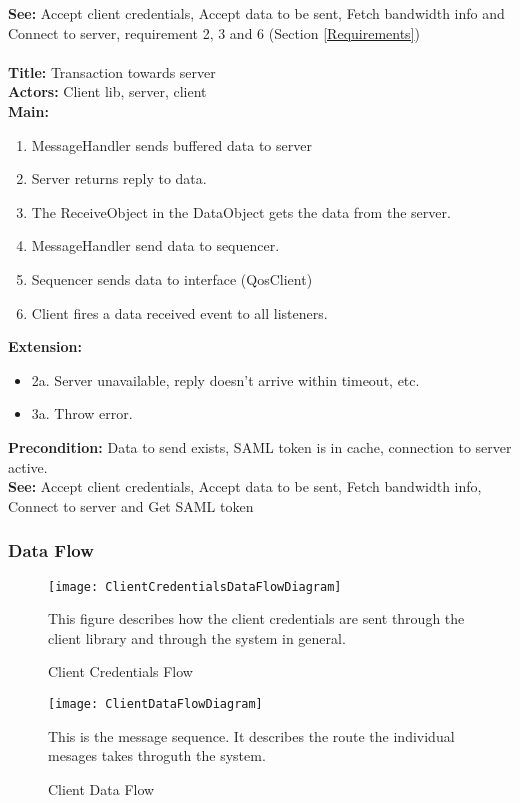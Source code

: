 		\textbf{See:} Accept client credentials, Accept data to be sent, Fetch bandwidth info and Connect to server, requirement 2, 3 and 6 (Section \ref{Requirements})
		\\\\
		\textbf{Title:} Transaction towards server \\
		\textbf{Actors:} Client lib, server, client \\
		\textbf{Main:}
		\begin{enumerate}
			\item MessageHandler sends buffered data to server
			\item Server returns reply to data.
			\item The ReceiveObject in the DataObject gets the data from the server.
			\item MessageHandler send data to sequencer.
			\item Sequencer sends data to interface (QosClient)
			\item Client fires a data received event to all listeners.
		\end{enumerate}
		\textbf{Extension:}
		\begin{itemize}
			 \item[] 2a. Server unavailable, reply doesn’t arrive within timeout, etc.
			 \item[] 3a. Throw error.
		\end{itemize}
		\textbf{Precondition:} Data to send exists, SAML token is in cache, connection to server active.\\
		\textbf{See:} Accept client credentials, Accept data to be sent, Fetch bandwidth info, Connect to server and Get SAML token
		
	\subsubsection{Data Flow}\label{textual client data flow}
        
    \begin{figure}[h]
        \centering
        \texttt{[image: ClientCredentialsDataFlowDiagram]}
        \caption{Client Credentials Flow}
        This figure describes how the client credentials are sent through the client library and through the system in general. 
        \label{fig:ClientCredentialsDataFlowDiagram}
    \end{figure}
    
    \begin{figure}[h]
        \centering
        \texttt{[image: ClientDataFlowDiagram]}
        \caption{Client Data Flow}
        This is the message sequence. It describes the route the individual mesages takes throguth the system. 
        \label{fig:ClientDataFlowDiagram}
    \end{figure}
    
